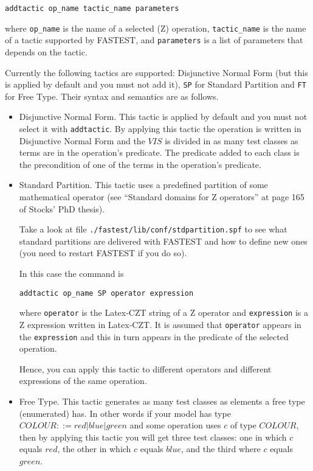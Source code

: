 \begin{center}
\verb+addtactic op_name tactic_name parameters+
\end{center}

where \verb+op_name+ is the name of a selected (Z) operation, \verb+tactic_name+ is the name of a tactic supported by FASTEST, and \verb+parameters+ is a list of parameters that depends on the tactic.

Currently the following tactics are supported: Disjunctive Normal Form (but this is applied by default and you must not add it), \verb+SP+ for Standard Partition and \verb+FT+ for Free Type. Their syntax and semantics are as follows.

\begin{itemize}
\item Disjunctive Normal Form. This tactic is applied by default and you must not select it with \verb+addtactic+. By applying this tactic the operation is written in Disjunctive Normal Form and the $VIS$ is divided in as many test classes as terms are in the operation's predicate. The predicate added to each class is the precondition of one of the terms in the operation's predicate.

\item Standard Partition. This tactic uses a predefined partition of some mathematical operator (see ``Standard domains for Z operators'' at page 165 of Stocks' PhD thesis). 

Take a look at file \verb+./fastest/lib/conf/stdpartition.spf+ to see what standard partitions are delivered with FASTEST and how to define new ones (you need to restart FASTEST if you do so).

In this case the command is

\begin{center}
\verb+addtactic op_name SP operator expression+
\end{center}

where \verb+operator+ is the Latex-CZT string of a Z operator and \verb+expression+ is a Z expression written in Latex-CZT. It is assumed that \verb+operator+ appears in the \verb+expression+ and this in turn appears in the predicate of the selected operation. 

Hence, you can apply this tactic to different operators and different expressions of the same operation.

\item Free Type. This tactic generates as many test classes as elements a free type (enumerated) has. In other words if your model has type $COLOUR ::= red | blue | green$ and some operation uses $c$ of type $COLOUR$, then by applying this tactic you will get three test classes: one in which $c$ equals $red$, the other in which $c$ equals $blue$, and the third where $c$ equals $green$.


\end{itemize}
